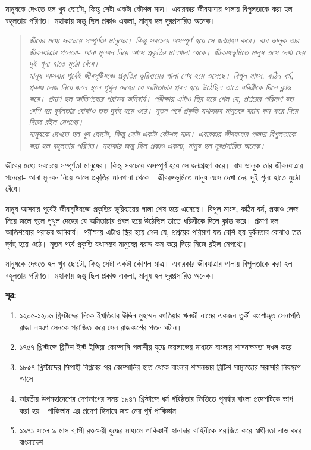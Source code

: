মানুষকে দেখতে হল খুব ছোটো, কিন্তু সেটা একটা কৌশল মাত্র। এবারকার জীবযাত্রার পালায় বিপুলতাকে করা হল বহুলতায় পরিণত। মহাকায় জন্তু ছিল প্রকাণ্ড একলা, মানুষ হল দূরপ্রসারিত অনেক। 
\begin{quotation}
	\textit{জীবের মধ্যে সবচেয়ে সম্পূর্ণতা মানুষের। কিন্তু সবচেয়ে অসম্পূর্ণ হয়ে সে জন্মগ্রহণ করে। বাঘ ভালুক তার জীবনযাত্রার পনেরো- আনা মূলধন নিয়ে আসে প্রকৃতির মালখানা থেকে। জীবরঙ্গভূমিতে মানুষ এসে দেখা দেয় দুই শূন্য হাতে মুঠো বেঁধে।\\
	মানুষ আসবার পূর্বেই জীবসৃষ্টিযজ্ঞে প্রকৃতির ভূরিব্যয়ের পালা শেষ হয়ে এসেছে। বিপুল মাংস, কঠিন বর্ম, প্রকাণ্ড লেজ নিয়ে জলে স্থলে পৃথুল দেহের যে অমিতাচার প্রবল হয়ে উঠেছিল তাতে ধরিত্রীকে দিলে ক্লান্ত করে। প্রমাণ হল আতিশয্যের পরাভব অনিবার্য। পরীক্ষায় এটাও স্থির হয়ে গেল যে, প্রশ্রয়ের পরিমাণ যত বেশি হয় দুর্বলতার বোঝাও তত দুর্বহ হয়ে ওঠে। নূতন পর্বে প্রকৃতি যথাসম্ভব মানুষের বরাদ্দ কম করে দিয়ে নিজে রইল নেপথ্যে।\\
	মানুষকে দেখতে হল খুব ছোটো, কিন্তু সেটা একটা কৌশল মাত্র। এবারকার জীবযাত্রার পালায় বিপুলতাকে করা হল বহুলতায় পরিণত। মহাকায় জন্তু ছিল প্রকাণ্ড একলা, মানুষ হল দূরপ্রসারিত অনেক।}
\end{quotation}
জীবের মধ্যে সবচেয়ে সম্পূর্ণতা মানুষের। কিন্তু সবচেয়ে অসম্পূর্ণ হয়ে সে জন্মগ্রহণ করে। বাঘ ভালুক তার জীবনযাত্রার পনেরো- আনা মূলধন নিয়ে আসে প্রকৃতির মালখানা থেকে। জীবরঙ্গভূমিতে মানুষ এসে দেখা দেয় দুই শূন্য হাতে মুঠো বেঁধে।

মানুষ আসবার পূর্বেই জীবসৃষ্টিযজ্ঞে প্রকৃতির ভূরিব্যয়ের পালা শেষ হয়ে এসেছে। বিপুল মাংস, কঠিন বর্ম, প্রকাণ্ড লেজ নিয়ে জলে স্থলে পৃথুল দেহের যে অমিতাচার প্রবল হয়ে উঠেছিল তাতে ধরিত্রীকে দিলে ক্লান্ত করে। প্রমাণ হল আতিশয্যের পরাভব অনিবার্য। পরীক্ষায় এটাও স্থির হয়ে গেল যে, প্রশ্রয়ের পরিমাণ যত বেশি হয় দুর্বলতার বোঝাও তত দুর্বহ হয়ে ওঠে। নূতন পর্বে প্রকৃতি যথাসম্ভব মানুষের বরাদ্দ কম করে দিয়ে নিজে রইল নেপথ্যে।

মানুষকে দেখতে হল খুব ছোটো, কিন্তু সেটা একটা কৌশল মাত্র। এবারকার জীবযাত্রার পালায় বিপুলতাকে করা হল বহুলতায় পরিণত। মহাকায় জন্তু ছিল প্রকাণ্ড একলা, মানুষ হল দূরপ্রসারিত অনেক।

\vskip 30pt
\scriptsize
	\textbf{সূত্র:}
	\begin{enumerate}%
		\item ১২০৫-১২০৬ খ্রিস্টাব্দের দিকে ইখতিয়ার উদ্দিন মুহম্মদ বখতিয়ার খলজী নামের একজন তুর্কী বংশোদ্ভূত সেনাপতি রাজা লক্ষ্মণ সেনকে পরাজিত করে সেন রাজবংশের পতন ঘটান।
		\item ১৭৫৭ খ্রিস্টাব্দে ব্রিটিশ ইস্ট ইন্ডিয়া কোম্পানি পলাশীর যুদ্ধে জয়লাভের মাধ্যমে বাংলার শাসনক্ষমতা দখল করে
		\item ১৮৫৭ খ্রিস্টাব্দের সিপাহী বিপ্লবের পর কোম্পানির হাত থেকে বাংলার শাসনভার ব্রিটিশ সাম্রাজ্যের সরাসরি নিয়ন্ত্রণে আসে
		\item ভারতীয় উপমহাদেশের দেশভাগের সময় ১৯৪৭ খ্রিস্টাব্দে ধর্ম গরিষ্ঠতার ভিত্তিতে পুনর্বার বাংলা প্রদেশটিকে ভাগ করা হয়। পাকিস্তান এর প্রদেশ হিসাবে জন্ম নেয় পূর্ব পাকিস্তান 
		\item ১৯৭১ সালে ৯ মাস ব্যাপী রক্তক্ষয়ী যুদ্ধের মাধ্যমে পাকিস্তানী হানাদার বাহিনীকে পরাজিত করে স্বাধীনতা লাভ করে বাংলাদেশ 
	\end{enumerate}


